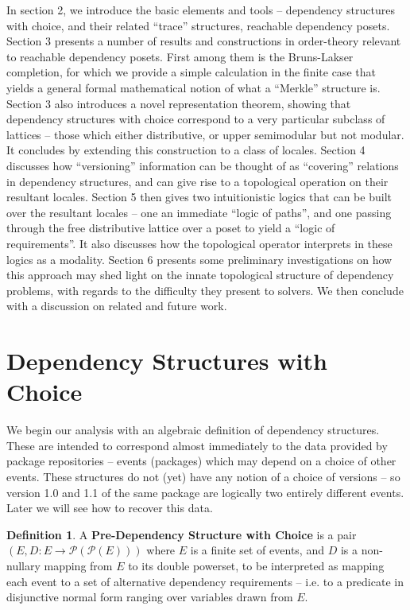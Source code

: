 \documentclass[hoptionsi,review,screen,format=acmsmall]{acmart}
\theoremstyle{definition}
\newtheorem{definition}{Definition}[section]
\newcommand{\Pc}{\mathcal{P}}
\begin{document}
In section 2, we introduce the basic elements and tools -- dependency structures with choice, and their related ``trace'' structures, reachable dependency posets. Section 3 presents a number of results and constructions in order-theory relevant to reachable dependency posets. First among them is the Bruns-Lakser completion, for which we provide a simple calculation in the finite case that yields a general formal mathematical notion of what a ``Merkle'' structure is. Section 3 also introduces a novel representation theorem, showing that dependency structures with choice correspond to a very particular subclass of lattices -- those which either distributive, or upper semimodular but not modular. It concludes by extending this construction to a class of locales. Section 4 discusses how ``versioning'' information can be thought of as ``covering'' relations in dependency structures, and can give rise to a topological operation on their resultant locales. Section 5 then gives  two intuitionistic logics that can be built over the resultant locales  -- one an immediate ``logic of paths'', and one passing through the free distributive lattice over a poset to yield a ``logic of requirements''. It also discusses how the topological operator interprets in these logics as a modality. Section 6 presents some preliminary investigations on how this approach may shed light on the innate topological structure of dependency problems, with regards to the difficulty they present to solvers. We then conclude with a discussion on related and future work.

\section{Dependency Structures with Choice}
We begin our analysis with an algebraic definition of dependency structures. These are intended to correspond almost immediately to the data provided by package repositories -- events (packages) which may depend on a choice of other events. These structures do not (yet) have any notion of a choice of versions -- so version 1.0 and 1.1 of the same package are logically two entirely different events. Later we will see how to recover this data.

\begin{definition}
A \textbf{Pre-Dependency Structure with Choice} is a pair \((E, D : E \rightarrow \Pc(\Pc(E)))\) where \(E\) is a finite set of events, and \(D\) is a non-nullary mapping from \(E\) to its double powerset, to be interpreted as mapping each event to a set of alternative dependency requirements -- i.e. to a predicate in disjunctive normal form ranging over variables drawn from \(E\).
\end{definition}
\end{document}
